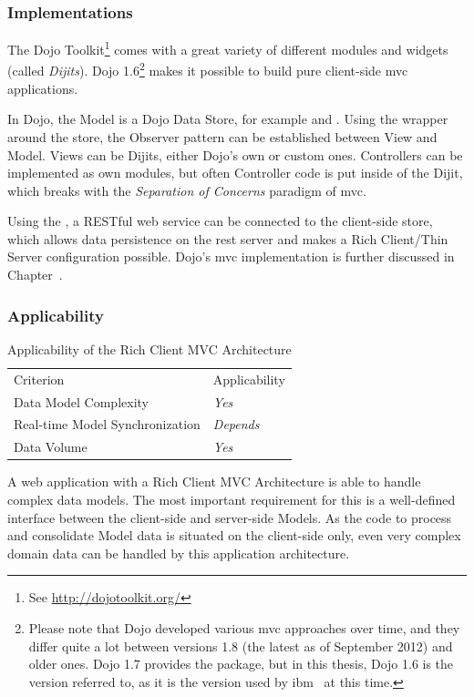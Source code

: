 \subsubsection{Implementations}
The Dojo Toolkit\footnote{See \url{http://dojotoolkit.org/}} comes with a great variety of different modules and widgets (called \emph{Dijits}). Dojo 1.6\footnote{Please note that Dojo developed various \ac{mvc} approaches over time, and they differ quite a lot between versions 1.8 (the latest as of September 2012) and older ones. Dojo 1.7 provides the  package, but in this thesis, Dojo 1.6 is the version referred to, as it is the version used by \ac{ibm} \nexus\ at this time.} makes it possible to build pure client-side \ac{mvc} applications.

In Dojo, the Model is a Dojo Data Store, for example  and . Using the  wrapper around the store, the Observer pattern can be established between View and Model. Views can be Dijits, either Dojo's own or custom ones. Controllers can be implemented as own modules, but often Controller code is put inside of the Dijit, which breaks with the \emph{Separation of Concerns} paradigm of \ac{mvc}.

Using the , a RESTful web service can be connected to the client-side store, which allows data persistence on the \acs{rest} server and makes a Rich Client/Thin Server configuration possible.
Dojo's \ac{mvc} implementation is further discussed in Chapter~.

\subsubsection{Applicability}
\begin{table}[H]
	\centering
	\begin{tabular}{l l}
\rowcolor{lightgray}
Criterion & Applicability\\
Data Model Complexity & \emph{Yes}\\
Real-time Model Synchronization & \emph{Depends}\\
Data Volume & \emph{Yes}\\
	\end{tabular}
	\caption{Applicability of the Rich Client MVC Architecture}
\end{table}

A web application with a Rich Client MVC Architecture is able to handle complex data models. The most important requirement for this is a well-defined interface between the client-side and server-side Models. As the code to process and consolidate Model data is situated on the client-side only, even very complex domain data can be handled by this application architecture.

